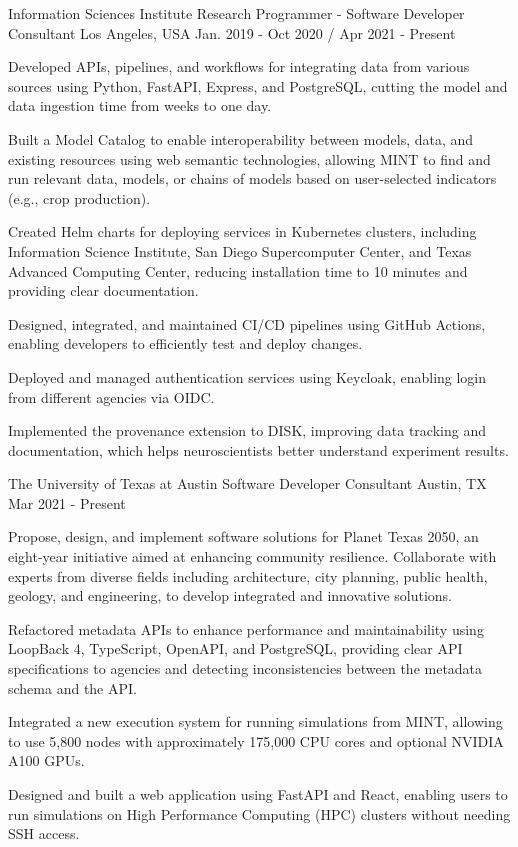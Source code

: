 \begin{cventries}

  \cventry
    {Information Sciences Institute}
    {Research Programmer - Software Developer Consultant}
    {Los Angeles, USA}
    {Jan. 2019 - Oct 2020 / Apr 2021 - Present}
    {
      \begin{cvitems}
        \item{Developed APIs, pipelines, and workflows for integrating data from various sources using Python, FastAPI, Express, and PostgreSQL, cutting the model and data ingestion time from weeks to one day.}
        \item{Built a Model Catalog to enable interoperability between models, data, and existing resources using web semantic technologies, allowing MINT to find and run relevant data, models, or chains of models based on user-selected indicators (e.g., crop production).}
        \item{Created Helm charts for deploying services in Kubernetes clusters, including Information Science Institute, San Diego Supercomputer Center, and Texas Advanced Computing Center, reducing installation time to 10 minutes and providing clear documentation.}
        \item{Designed, integrated, and maintained CI/CD pipelines using GitHub Actions, enabling developers to efficiently test and deploy changes.}
        \item{Deployed and managed authentication services using Keycloak, enabling login from different agencies via OIDC.}
        \item{Implemented the provenance extension to DISK, improving data tracking and documentation, which helps neuroscientists better understand experiment results.}
      \end{cvitems}
    }
  \cventry
    {The University of Texas at Austin}
    {Software Developer Consultant}
    {Austin, TX}
    {Mar 2021 - Present}
    {
      \begin{cvitems}
        \item{Propose, design, and implement software solutions for Planet Texas 2050, an eight-year initiative aimed at enhancing community resilience. Collaborate with experts from diverse fields including architecture, city planning, public health, geology, and engineering, to develop integrated and innovative solutions.}
        \item{Refactored metadata APIs to enhance performance and maintainability using LoopBack 4, TypeScript, OpenAPI, and PostgreSQL, providing clear API specifications to agencies and detecting inconsistencies between the metadata schema and the API.}
        \item{Integrated a new execution system for running simulations from MINT, allowing to use 5,800 nodes with approximately 175,000 CPU cores and optional NVIDIA A100 GPUs.}
        \item{Designed and built a web application using FastAPI and React, enabling users to run simulations on High Performance Computing (HPC) clusters without needing SSH access.}
      \end{cvitems}
    }



\end{cventries}
